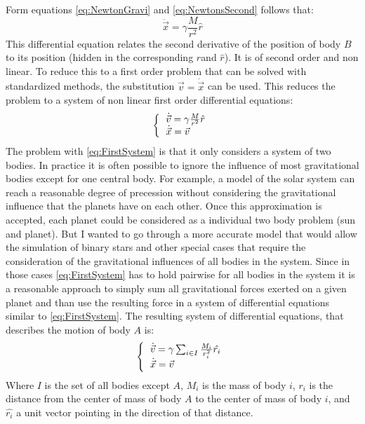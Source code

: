 \documentclass[a4paper,onesided,10pt]{article}
\begin{document}
Form equations \ref{eq:NewtonGravi} and \ref{eq:NewtonsSecond} follows that:
\begin{equation}
\ddot{\vec{x}} = \gamma \frac{M}{r^2} \hat{r}
\label{eq:diffEqOne}
\end{equation}
This differential equation relates the second derivative of the position of body $B$ to its position (hidden in the corresponding $r$and $\hat{r}$). It is of second order and non linear. To reduce this to a first order problem that can be solved with standardized methods, the substitution $\vec{v} = \dot{\vec{x}}$ can be used. This reduces the problem to a system of non linear first order differential equations:
\begin{equation}
\left\{ \begin{tabular}{l}
$\dot{\vec{v}} = \gamma \frac{M}{r^2} \hat{r}$ \\
$\dot{\vec{x}} = \vec{v}$
\end{tabular}\right.
\label{eq:FirstSystem}
\end{equation}
The problem with \ref{eq:FirstSystem} is that it only considers a system of two bodies. In practice it is often possible to ignore the influence of most gravitational bodies except for one central body. For example, a model of the solar system can reach a reasonable degree of precession without considering the gravitational influence that the planets have on each other. Once this approximation is accepted, each planet could be considered as a individual two body problem (sun and planet). But I wanted to go through a more accurate model that would allow the simulation of binary stars and other special cases that require the consideration of the gravitational influences of all bodies in the system. Since in those cases \ref{eq:FirstSystem} has to hold pairwise for all bodies in the system it is a reasonable approach to simply sum all gravitational forces exerted on a given planet and than use the resulting force in a system of differential equations similar to \ref{eq:FirstSystem}. The resulting system of differential equations, that describes the motion of body $A$ is:
\begin{equation}
\left\{ \begin{tabular}{l}
$\dot{\vec{v}} = \gamma \sum_{i \in I}{\frac{M_i}{r_i^2} \hat{r_i}}$ \\
$\dot{\vec{x}} = \vec{v}$
\end{tabular}\right.
\label{eq:SecondSystem}
\end{equation}
Where $I$ is the set of all bodies except $A$, $M_i$ is the mass of body $i$, $r_i$ is the distance from the center of mass of body $A$ to the center of mass of body $i$, and $\hat{r_i}$ a unit vector pointing in the direction of that distance.
\end{document}
